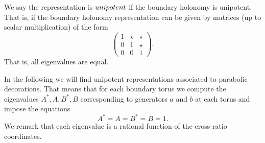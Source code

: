 We say the representation is $\sl unipotent$ if the boundary holonomy is unipotent.  That is, if the boundary holonomy representation can be given by matrices (up to scalar multiplication) of the form
$$ \left(
\begin{matrix}
1 & \star & \star\\
0 & 1 & \star \\
0 & 0 & 1
\end{matrix} \right ) .$$
That is, all eigenvalues are equal.

 In the following we will find unipotent representations associated to parabolic decorations.  That means that for each boundary torus
 we compute the eigenvalues  $A^*, A, B^*, B$ corresponding to generators $a$ and $b$ at each torus and impose the equations
 $$
 A^*= A= B^*= B=1.
 $$
 We remark that each eigenvalue is a rational function of the cross-ratio coordinates.


